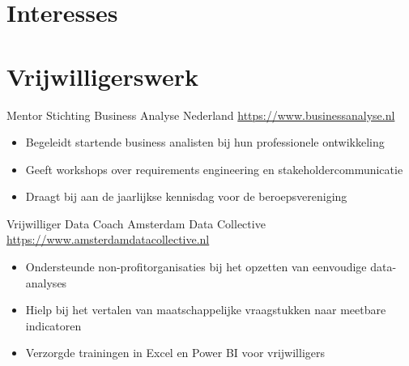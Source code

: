 \documentclass[a4paper, serif, 10pt]{moderncv}
\begin{document}
\section{Interesses}

\section{Vrijwilligerswerk}

        {Mentor}
        {Stichting Business Analyse Nederland}
        {\url{https://www.businessanalyse.nl}}
        {}
        {\begin{itemize}
\item Begeleidt startende business analisten bij hun professionele ontwikkeling
\item Geeft workshops over requirements engineering en stakeholdercommunicatie
\item Draagt bij aan de jaarlijkse kennisdag voor de beroepsvereniging
\end{itemize}}
    

        {Vrijwilliger Data Coach}
        {Amsterdam Data Collective}
        {\url{https://www.amsterdamdatacollective.nl}}
        {}
        {\begin{itemize}
\item Ondersteunde non-profitorganisaties bij het opzetten van eenvoudige data-analyses
\item Hielp bij het vertalen van maatschappelijke vraagstukken naar meetbare indicatoren
\item Verzorgde trainingen in Excel en Power BI voor vrijwilligers
\end{itemize}}
    
\end{document}
